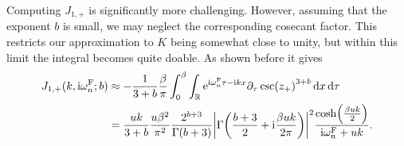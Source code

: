 \documentclass[english, parskip=full]{scrartcl}
\begin{document}
Computing $J_{1,+}$ is significantly more challenging.
However, assuming that the exponent $b$ is small, we may neglect the corresponding cosecant factor.
This restricts our approximation to $K$ being somewhat close to unity, but within this limit the integral becomes quite doable.
As shown before it gives
\begin{align}
J_{1,+}(k,\i\omega_n^\F;b) &\approx -\frac{1}{3+b}  \frac{\beta}{\pi} \intx{0}{\beta}{\intr{\powe{\i \omega_n^\F \tau - \i kx} \partial_\tau \csc(z_+)^{3+b}}{x} }{\tau}\\
&= \frac{uk}{3+b} \frac{u\beta^2}{\pi^2} \frac{2^{b+3}}{\Gamma(b+3)} \abs*{\Gamma\kla*{\frac{b+3}{2}+\i \frac{\beta uk}{2\pi}}}^2 \frac{\cosh\kla*{\frac{\beta u k}{2}}}{\i\omega_n^\F + uk}.
\end{align}
\end{document}
